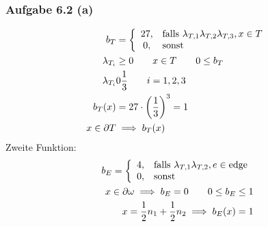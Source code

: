\subsubsection{Aufgabe 6.2 (a)}
\begin{align*}
	b_T&=\left\lbrace\begin{array}{cl}
		27, &\text{falls } \lambda_{T,1}\lambda_{T,2}\lambda_{T,3},x\in T\\
		0, &\text{sonst }
	\end{array}\right.\\
	\lambda_{T_i}&\geq 0\qquad x\in T\qquad 0\leq b_T\\
	\lambda_{T_i}&0\frac{1}{3}\qquad i=1,2,3\\
	b_T(x)&=27\cdot\left(\frac{1}{3}\right)^3=1\\
	x\in\partial T&\implies b_T(x)
\end{align*}
Zweite Funktion:
\begin{align*}
	b_E=\left\lbrace\begin{array}{cl}
		4, &\text{falls }\lambda_{T,1}\lambda_{T,2},e\in\text{edge}\\
		0, &\text{sonst }
	\end{array}\right.\\
	x\in\partial\omega\implies b_E=0\qquad 0\leq b_E\leq 1\\
	x=\frac{1}{2}n_1+\frac{1}{2}n_2\implies b_E(x)=1
\end{align*}



